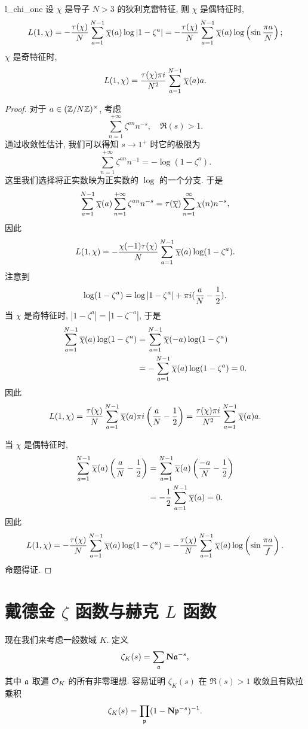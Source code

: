 \begin{theorem}{}{l_chi_one}
设 $\chi$ 是导子 $N>3$ 的狄利克雷特征, 则 $\chi$ 是偶特征时,
  \[L(1,\chi)=-\frac{\tau(\chi)}{N}\sum_{a=1}^{N-1}\overline \chi(a)\log|1-\zeta^a|=-\frac{\tau(\chi)}{N}\sum_{a=1}^{N-1}\overline\chi(a)\log\left(\sin \frac{\pi a}{N}\right);\]
$\chi$ 是奇特征时,
  \[L(1,\chi)=\frac{\tau(\chi)\pi i}{N^2}\sum_{a=1}^{N-1}\overline\chi(a)a.\]
\end{theorem}
\begin{proof}
对于 $a\in({\mathbb{Z}}/N{\mathbb{Z}})^\times$, 考虑 
  \[\sum_{n=1}^{+\infty} \zeta^{an}n^{-s},\quad\Re(s)>1.\]
通过收敛性估计, 我们可以得知 $s\to 1^+$ 时它的极限为
  \[\sum_{n=1}^{+\infty}\zeta^{an}n^{-1}=-\log(1-\zeta^a).\]
这里我们选择将正实数映为正实数的 $\log$ 的一个分支. 于是
  \[\sum_{a=1}^{N-1}\overline\chi(a)\sum_{n=1}^{+\infty}\zeta^{an}n^{-s}=\tau(\overline\chi)\sum_{n=1}^\infty\chi(n)n^{-s},\]
因此
  \[L(1,\chi)=-\frac{\chi(-1)\tau(\chi)}{N}\sum_{a=1}^{N-1}\overline\chi(a)\log(1-\zeta^a).\]
注意到
  \[\log(1-\zeta^a)=\log|1-\zeta^a|+\pi i(\frac{a}{N}-\frac{1}{2}).\]
当 $\chi$ 是奇特征时, $|1-\zeta^a|=|1-\zeta^{-a}|$, 于是
  \[\begin{split}
    \sum_{a=1}^{N-1}\overline\chi(a)\log(1-\zeta^a)
      &=\sum_{a=1}^{N-1}\overline\chi(-a)\log(1-\zeta^a)\\
      &=-\sum_{a=1}^{N-1}\overline\chi(a)\log(1-\zeta^a)=0.
  \end{split}\]
因此
  \[L(1,\chi)=\frac{\tau(\chi)}N\sum_{a=1}^{N-1}\overline\chi(a)\pi i \left(\frac aN-\frac{1}{2}\right)
    =\frac{\tau(\chi)\pi i}{N^2}\sum_{a=1}^{N-1}\overline\chi(a)a.\]

当 $\chi$ 是偶特征时,
  \[\begin{split}
  \sum_{a=1}^{N-1}\overline\chi(a)\left(\frac aN-\frac12\right)
    &=\sum_{a=1}^{N-1}\overline\chi(a)\left(\frac{-a}N-\frac12\right)\\
    &=-\frac{1}{2}\sum_{a=1}^{N-1}\overline\chi(a)=0.
  \end{split}\]
因此
  \[L(1,\chi)=-\frac{\tau(\chi)}N\sum_{a=1}^{N-1}\overline\chi(a)\log(1-\zeta^a)
    =-\frac{\tau(\chi)}N\sum_{a=1}^{N-1}\overline\chi(a)\log\left(\sin\frac{\pi a}f\right).\]
命题得证.
\end{proof}


\section{戴德金 \texorpdfstring{$\zeta$}{ζ} 函数与赫克 \texorpdfstring{$L$}{L} 函数}


现在我们来考虑一般数域 $K$. 
定义
  \[\zeta_K(s)=\sum_{\mathfrak{a}} {\mathbf{N}}{\mathfrak{a}}^{-s},\]
其中 ${\mathfrak{a}}$ 取遍 ${\mathcal{O}}_K$ 的所有非零理想.
容易证明 $\zeta_K(s)$ 在 $\Re(s)>1$ 收敛且有欧拉乘积
  \[\zeta_K(s)=\prod_{\mathfrak{p}}(1-{\mathbf{N}}{\mathfrak{p}}^{-s})^{-1}.\]

